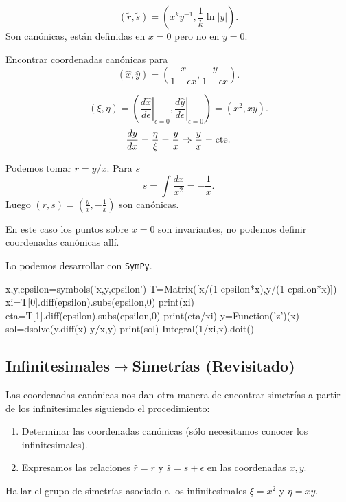 \[(\tilde{r},\tilde{s})=(x^ky^{-1},\frac{1}{k}\ln|y|).\]
Son canónicas, están definidas en $x=0$ pero no en $y=0$.  


\begin{ejemplo}{} Encontrar coordenadas canónicas para
\[(\hat{x},\hat{y})=\left( \frac{x}{1-\epsilon x},\frac{y}{1-\epsilon x}\right).\]
\end{ejemplo}

\[(\xi,\eta)=\left(\left.\frac{d\hat{x}}{d\epsilon}\right|_{\epsilon=0},\left.\frac{d\hat{y}}{d\epsilon}\right|_{\epsilon=0}\right)=(x^2,xy).\]
\label{pag:can_ejem_p}
\[\frac{dy}{dx}=\frac{\eta}{\xi}=\frac{y}{x}\Rightarrow \frac{y}{x}=\hbox{cte}.\]

Podemos tomar $r=y/x$. Para $s$
\[s=\int\frac{dx}{x^2}=-\frac{1}{x}.\]
Luego $(r,s)=(\frac{y}{x},-\frac{1}{x})$ son canónicas.

En este caso los puntos sobre $x=0$ son invariantes, no podemos definir coordenadas canónicas allí.

Lo podemos desarrollar con \texttt{SymPy}. 

\begin{sympyblock}[][frame=single]
x,y,epsilon=symbols('x,y,epsilon')
T=Matrix([x/(1-epsilon*x),y/(1-epsilon*x)])
xi=T[0].diff(epsilon).subs(epsilon,0)
print(xi)
eta=T[1].diff(epsilon).subs(epsilon,0)
print(eta/xi)
y=Function('z')(x)
sol=dsolve(y.diff(x)-y/x,y)
print(sol)
Integral(1/xi,x).doit()
\end{sympyblock}





\subsection{Infinitesimales$\to$Simetrías (Revisitado)}
Las coordenadas canónicas nos dan otra manera de encontrar simetrías a partir de los infinitesimales siguiendo el procedimiento:

\begin{enumerate}
\item Determinar las coordenadas canónicas  (sólo necesitamos conocer los infinitesimales).
\item Expresamos las relaciones $\hat{r}=r$ y $\hat{s}=s+\epsilon$ en las coordenadas $x,y$.
\end{enumerate}


\begin{ejemplo}{} Hallar el grupo de simetrías asociado a los infinitesimales 
$\xi=x^2$ y $\eta=xy$.
\end{ejemplo}


